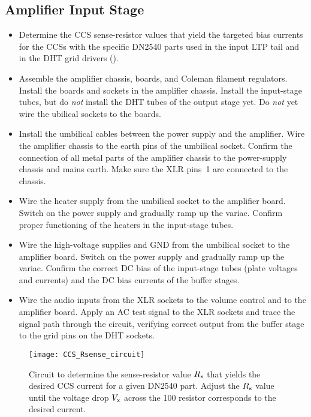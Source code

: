 \subsection{Amplifier Input Stage}
\begin{itemize}
\item Determine the CCS sense-resistor values that yield the targeted bias currents for the CCSs with the specific DN2540 parts used in the input LTP tail and in the DHT grid drivers ().
\item Assemble the amplifier chassis, boards, and Coleman filament regulators. Install the boards and sockets in the amplifier chassis. Install the input-stage tubes, but do \emph{not} install the DHT tubes of the output stage yet. Do \emph{not} yet wire the ubilical sockets to the boards.
\item Install the umbilical cables between the power supply and the amplifier. Wire the amplifier chassis to the earth pins of the umbilical socket. Confirm the connection of all metal parts of the amplifier chassis to the power-supply chassis and mains earth. Make sure the XLR pins~1 are connected to the chassis.
\item Wire the heater supply from the umbilical socket to the amplifier board. Switch on the power supply and gradually ramp up the variac. Confirm proper functioning of the heaters in the input-stage tubes.
\item Wire the high-voltage supplies and GND from the umbilical socket to the amplifier board. Switch on the power supply and gradually ramp up the variac. Confirm the correct DC bias of the input-stage tubes (plate voltages and currents) and the DC bias currents of the buffer stages.
\item Wire the audio inputs from the XLR sockets to the volume control and to the amplifier board. Apply an AC test signal to the XLR sockets and trace the signal path through the circuit, verifying correct output from the buffer stage to the grid pins on the DHT sockets.
\end{itemize}

\begin{figure}
\begin{center}
\texttt{[image: CCS\_Rsense\_circuit]}
\caption{Circuit to determine the sense-resistor value $R_{\rm s}$ that yields the desired CCS current for a given DN2540 part. Adjust the $R_{\rm s}$ value until the voltage drop $V_{\rm x}$ across the \SI{100}{\Ohm} resistor corresponds to the desired current.}
\end{center}
\end{figure}


